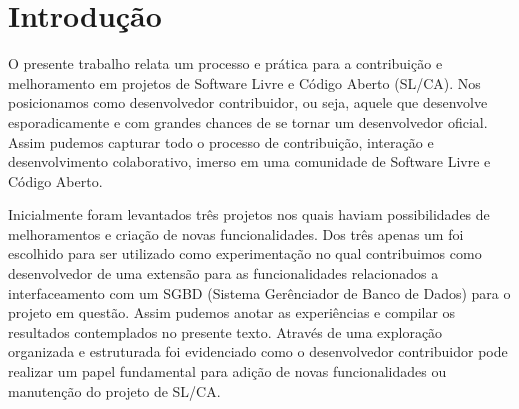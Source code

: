 % 
% 
% 
% 

\section{Introdução} \label{sec:introducao}

O presente trabalho relata um processo e prática para a contribuição e melhoramento em projetos de Software Livre e Código Aberto (SL/CA). Nos posicionamos como desenvolvedor contribuidor, ou seja, aquele que desenvolve esporadicamente e com grandes chances de se tornar um desenvolvedor oficial. Assim pudemos capturar todo o processo de contribuição, interação e desenvolvimento colaborativo, imerso em uma comunidade de Software Livre e Código Aberto.
 
Inicialmente foram levantados três projetos nos quais haviam possibilidades de melhoramentos e criação de novas funcionalidades. Dos três apenas um foi escolhido para ser utilizado como experimentação no qual contribuimos como desenvolvedor de uma extensão para as funcionalidades relacionados a interfaceamento com um SGBD (Sistema Gerênciador de Banco de Dados) para o projeto em questão. Assim pudemos anotar as experiências e compilar os resultados contemplados no presente texto. 
Através de uma exploração organizada e estruturada foi evidenciado como o desenvolvedor contribuidor pode realizar um papel fundamental para adição de novas funcionalidades ou manutenção do projeto de SL/CA.


